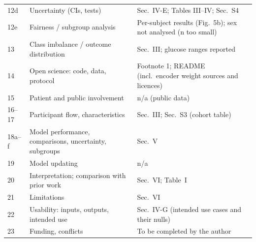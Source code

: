 \documentclass[journal,onecolumn]{IEEEtran}
\begin{document}
\begin{longtable}{@{}p{0.9cm}p{4.6cm}p{2.6cm}@{}}
12d & Uncertainty (CIs, tests) & Sec.~IV-E; Tables III--IV; Sec.~S4 \\
12e & Fairness / subgroup analysis & Per-subject results (Fig.~5b); sex not analysed (n too small) \\
13 & Class imbalance / outcome distribution & Sec.~III; glucose ranges reported \\
14 & Open science: code, data, protocol & Footnote 1; README (incl.\ encoder weight sources and licences) \\
15 & Patient and public involvement & n/a (public data) \\
16--17 & Participant flow, characteristics & Sec.~III; Sec.~S3 (cohort table) \\
18a--f & Model performance, comparisons, uncertainty, subgroups & Sec.~V \\
19 & Model updating & n/a \\
20 & Interpretation; comparison with prior work & Sec.~VI; Table~I \\
21 & Limitations & Sec.~VI \\
22 & Usability: inputs, outputs, intended use & Sec.~IV-G (intended use cases and their nulls) \\
23 & Funding, conflicts & To be completed by the author \\
\bottomrule
\end{longtable}
\end{document}
